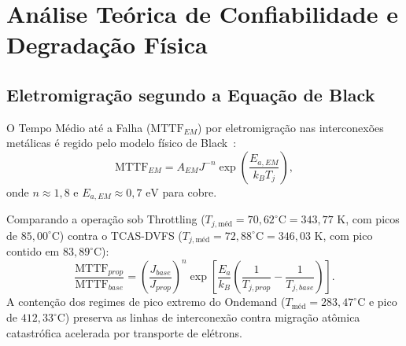 \documentclass[journal]{IEEEtran}
\begin{document}
\section{Análise Teórica de Confiabilidade e Degradação Física}

\subsection{Eletromigração segundo a Equação de Black}
O Tempo Médio até a Falha ($\text{MTTF}_{EM}$) por eletromigração nas interconexões metálicas é regido pelo modelo físico de Black~\cite{black1969electromigration}:
\begin{equation}
\text{MTTF}_{EM} = A_{EM} J^{-n} \exp\left( \frac{E_{a, EM}}{k_B T_j} \right),
\end{equation}
onde $n \approx 1{,}8$ e $E_{a, EM} \approx 0{,}7\text{ eV}$ para cobre.

Comparando a operação sob Throttling ($T_{j, \text{méd}} = 70{,}62^\circ\text{C} = 343{,}77\text{ K}$, com picos de $85{,}00^\circ\text{C}$) contra o TCAS-DVFS ($T_{j, \text{méd}} = 72{,}88^\circ\text{C} = 346{,}03\text{ K}$, com pico contido em $83{,}89^\circ\text{C}$):
\begin{equation}
\frac{\text{MTTF}_{prop}}{\text{MTTF}_{base}} = \left( \frac{J_{base}}{J_{prop}} \right)^n \exp\left[ \frac{E_{a}}{k_B} \left( \frac{1}{T_{j, prop}} - \frac{1}{T_{j, base}} \right) \right].
\end{equation}
A contenção dos regimes de pico extremo do Ondemand ($T_{\text{méd}} = 283{,}47^\circ\text{C}$ e pico de $412{,}33^\circ\text{C}$) preserva as linhas de interconexão contra migração atômica catastrófica acelerada por transporte de elétrons.
\end{document}
